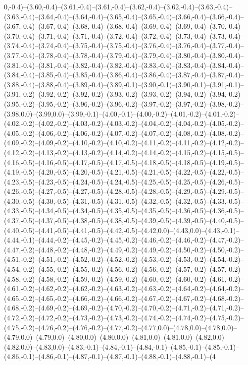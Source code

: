 0,-0.4)--(3.60,-0.4)--(3.61,-0.4)--(3.61,-0.4)--(3.62,-0.4)--(3.62,-0.4)--(3.63,-0.4)--(3.63,-0.4)--(3.64,-0.4)--(3.64,-0.4)--(3.65,-0.4)--(3.65,-0.4)--(3.66,-0.4)--(3.66,-0.4)--(3.67,-0.4)--(3.67,-0.4)--(3.68,-0.4)--(3.68,-0.4)--(3.69,-0.4)--(3.69,-0.4)--(3.70,-0.4)--(3.70,-0.4)--(3.71,-0.4)--(3.71,-0.4)--(3.72,-0.4)--(3.72,-0.4)--(3.73,-0.4)--(3.73,-0.4)--(3.74,-0.4)--(3.74,-0.4)--(3.75,-0.4)--(3.75,-0.4)--(3.76,-0.4)--(3.76,-0.4)--(3.77,-0.4)--(3.77,-0.4)--(3.78,-0.4)--(3.78,-0.4)--(3.79,-0.4)--(3.79,-0.4)--(3.80,-0.4)--(3.80,-0.4)--(3.81,-0.4)--(3.81,-0.4)--(3.82,-0.4)--(3.82,-0.4)--(3.83,-0.4)--(3.83,-0.4)--(3.84,-0.4)--(3.84,-0.4)--(3.85,-0.4)--(3.85,-0.4)--(3.86,-0.4)--(3.86,-0.4)--(3.87,-0.4)--(3.87,-0.4)--(3.88,-0.4)--(3.88,-0.4)--(3.89,-0.4)--(3.89,-0.1)--(3.90,-0.1)--(3.90,-0.1)--(3.91,-0.1)--(3.91,-0.2)--(3.92,-0.2)--(3.92,-0.2)--(3.93,-0.2)--(3.93,-0.2)--(3.94,-0.2)--(3.94,-0.2)--(3.95,-0.2)--(3.95,-0.2)--(3.96,-0.2)--(3.96,-0.2)--(3.97,-0.2)--(3.97,-0.2)--(3.98,-0.2)--(3.98,0.0)--(3.99,0.0)--(3.99,-0.1)--(4.00,-0.1)--(4.00,-0.2)--(4.01,-0.2)--(4.01,-0.2)--(4.02,-0.2)--(4.02,-0.2)--(4.03,-0.2)--(4.03,-0.2)--(4.04,-0.2)--(4.04,-0.2)--(4.05,-0.2)--(4.05,-0.2)--(4.06,-0.2)--(4.06,-0.2)--(4.07,-0.2)--(4.07,-0.2)--(4.08,-0.2)--(4.08,-0.2)--(4.09,-0.2)--(4.09,-0.2)--(4.10,-0.2)--(4.10,-0.2)--(4.11,-0.2)--(4.11,-0.2)--(4.12,-0.2)--(4.12,-0.2)--(4.13,-0.2)--(4.13,-0.2)--(4.14,-0.2)--(4.14,-0.2)--(4.15,-0.2)--(4.15,-0.5)--(4.16,-0.5)--(4.16,-0.5)--(4.17,-0.5)--(4.17,-0.5)--(4.18,-0.5)--(4.18,-0.5)--(4.19,-0.5)--(4.19,-0.5)--(4.20,-0.5)--(4.20,-0.5)--(4.21,-0.5)--(4.21,-0.5)--(4.22,-0.5)--(4.22,-0.5)--(4.23,-0.5)--(4.23,-0.5)--(4.24,-0.5)--(4.24,-0.5)--(4.25,-0.5)--(4.25,-0.5)--(4.26,-0.5)--(4.26,-0.5)--(4.27,-0.5)--(4.27,-0.5)--(4.28,-0.5)--(4.28,-0.5)--(4.29,-0.5)--(4.29,-0.5)--(4.30,-0.5)--(4.30,-0.5)--(4.31,-0.5)--(4.31,-0.5)--(4.32,-0.5)--(4.32,-0.5)--(4.33,-0.5)--(4.33,-0.5)--(4.34,-0.5)--(4.34,-0.5)--(4.35,-0.5)--(4.35,-0.5)--(4.36,-0.5)--(4.36,-0.5)--(4.37,-0.5)--(4.37,-0.5)--(4.38,-0.5)--(4.38,-0.5)--(4.39,-0.5)--(4.39,-0.5)--(4.40,-0.5)--(4.40,-0.5)--(4.41,-0.5)--(4.41,-0.5)--(4.42,-0.5)--(4.42,0.0)--(4.43,0.0)--(4.43,-0.1)--(4.44,-0.1)--(4.44,-0.2)--(4.45,-0.2)--(4.45,-0.2)--(4.46,-0.2)--(4.46,-0.2)--(4.47,-0.2)--(4.47,-0.2)--(4.48,-0.2)--(4.48,-0.2)--(4.49,-0.2)--(4.49,-0.2)--(4.50,-0.2)--(4.50,-0.2)--(4.51,-0.2)--(4.51,-0.2)--(4.52,-0.2)--(4.52,-0.2)--(4.53,-0.2)--(4.53,-0.2)--(4.54,-0.2)--(4.54,-0.2)--(4.55,-0.2)--(4.55,-0.2)--(4.56,-0.2)--(4.56,-0.2)--(4.57,-0.2)--(4.57,-0.2)--(4.58,-0.2)--(4.58,-0.2)--(4.59,-0.2)--(4.59,-0.2)--(4.60,-0.2)--(4.60,-0.2)--(4.61,-0.2)--(4.61,-0.2)--(4.62,-0.2)--(4.62,-0.2)--(4.63,-0.2)--(4.63,-0.2)--(4.64,-0.2)--(4.64,-0.2)--(4.65,-0.2)--(4.65,-0.2)--(4.66,-0.2)--(4.66,-0.2)--(4.67,-0.2)--(4.67,-0.2)--(4.68,-0.2)--(4.68,-0.2)--(4.69,-0.2)--(4.69,-0.2)--(4.70,-0.2)--(4.70,-0.2)--(4.71,-0.2)--(4.71,-0.2)--(4.72,-0.2)--(4.72,-0.2)--(4.73,-0.2)--(4.73,-0.2)--(4.74,-0.2)--(4.74,-0.2)--(4.75,-0.2)--(4.75,-0.2)--(4.76,-0.2)--(4.76,-0.2)--(4.77,-0.2)--(4.77,0.0)--(4.78,0.0)--(4.78,0.0)--(4.79,0.0)--(4.79,0.0)--(4.80,0.0)--(4.80,0.0)--(4.81,0.0)--(4.81,0.0)--(4.82,0.0)--(4.82,0.0)--(4.83,0.0)--(4.83,-0.1)--(4.84,-0.1)--(4.84,-0.1)--(4.85,-0.1)--(4.85,-0.1)--(4.86,-0.1)--(4.86,-0.1)--(4.87,-0.1)--(4.87,-0.1)--(4.88,-0.1)--(4.88,-0.1)--(4